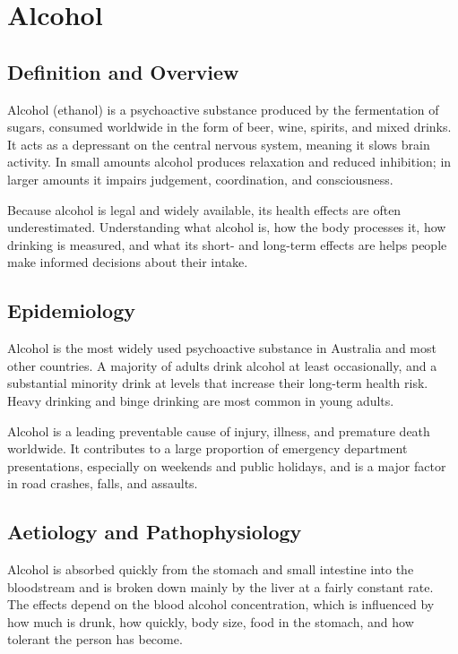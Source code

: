 \chapter{Alcohol}

\section*{Definition and Overview}
Alcohol (ethanol) is a psychoactive substance produced by the fermentation of sugars, consumed worldwide in the form of beer, wine, spirits, and mixed drinks. It acts as a depressant on the central nervous system, meaning it slows brain activity. In small amounts alcohol produces relaxation and reduced inhibition; in larger amounts it impairs judgement, coordination, and consciousness.

Because alcohol is legal and widely available, its health effects are often underestimated. Understanding what alcohol is, how the body processes it, how drinking is measured, and what its short- and long-term effects are helps people make informed decisions about their intake.

\section*{Epidemiology}
Alcohol is the most widely used psychoactive substance in Australia and most other countries. A majority of adults drink alcohol at least occasionally, and a substantial minority drink at levels that increase their long-term health risk. Heavy drinking and binge drinking are most common in young adults.

Alcohol is a leading preventable cause of injury, illness, and premature death worldwide. It contributes to a large proportion of emergency department presentations, especially on weekends and public holidays, and is a major factor in road crashes, falls, and assaults.

\section*{Aetiology and Pathophysiology}
Alcohol is absorbed quickly from the stomach and small intestine into the bloodstream and is broken down mainly by the liver at a fairly constant rate. The effects depend on the blood alcohol concentration, which is influenced by how much is drunk, how quickly, body size, food in the stomach, and how tolerant the person has become.

